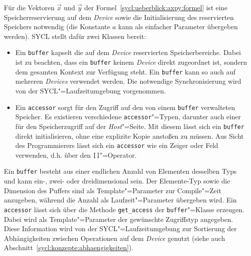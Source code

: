 Für die Vektoren $\vec{x}$ und $\vec{y}$ der
Formel~\ref{sycl:ueberblick:axpy:formel} ist eine Speicherreservierung auf dem
\textit{Device} sowie die Initialisierung des reservierten Speichers notwendig
(die Konstante $a$ kann als einfacher Parameter übergeben werden). SYCL stellt
dafür zwei Klassen bereit:
%
\begin{itemize}
    \item Ein \texttt{buffer} kapselt die auf dem \textit{Device} reservierten
          Speicherbereiche. Dabei ist zu beachten, dass ein \texttt{buffer}
          keinem \textit{Device} direkt zugeordnet ist, sondern dem gesamten
          Kontext zur Verfügung steht. Ein \texttt{buffer} kann so auch auf
          mehreren \textit{Devices} verwendet werden. Die notwendige
          Synchronisierung wird von der SYCL"=Laufzeitumgebung vorgenommen.
    \item Ein \texttt{accessor} sorgt für den Zugriff auf den von einem
          \texttt{buffer} verwalteten Speicher. Es existieren verschiedene
          \texttt{accessor}"=Typen, darunter auch einer für den Speicherzugriff
          auf der \textit{Host}"=Seite. Mit diesem lässt sich ein
          \texttt{buffer} direkt initialisieren, ohne eine explizite Kopie
          anstoßen zu müssen. Aus Sicht des Programmierers lässt sich ein
          \texttt{accessor} wie ein Zeiger oder Feld verwenden, d.h. über den
          \texttt{[]}"=Operator.
\end{itemize}
%
\noindent
Ein \texttt{buffer} besteht aus einer endlichen Anzahl von Elementen desselben
Typs und kann ein-, zwei- oder dreidimensional sein. Der Elemente-Typ sowie die
Dimension des Puffers sind als Template"=Parameter zur Compile"=Zeit anzugeben,
während die Anzahl als Laufzeit"=Parameter übergeben wird. Ein \texttt{accessor}
lässt sich über die Methode \texttt{get\_access} der \texttt{buffer}"=Klasse
erzeugen. Dabei wird als Template"=Parameter der gewünschte Zugriffstyp
angegeben. Diese Information wird von der SYCL"=Laufzeitumgebung zur Sortierung
der Abhängigkeiten zwischen Operationen auf dem \textit{Device} genutzt (siehe
auch Abschnitt~\ref{sycl:konzepte:abhaengigkeiten}).

